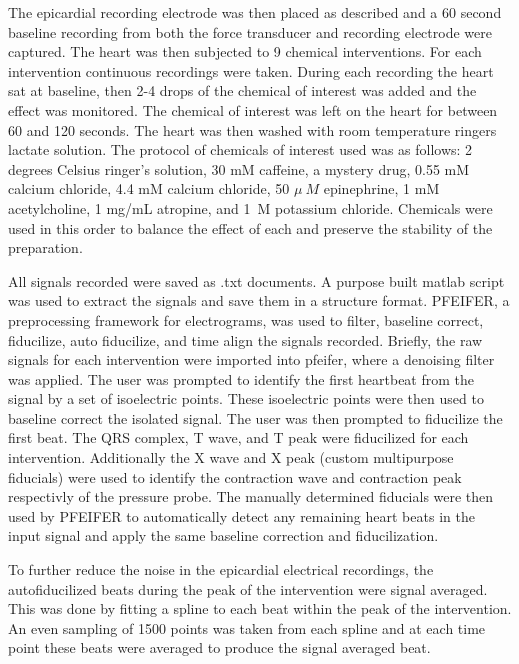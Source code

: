 \documentclass[12pt]{article}
\begin{document}
\par{}
The epicardial recording electrode was then placed as described and a 60 second baseline recording from both the force transducer and recording electrode were captured. The heart was then subjected to 9 chemical interventions. For each intervention continuous recordings were taken. During each recording the heart sat at baseline, then 2-4 drops of the chemical of interest was added and the effect was monitored. The chemical of interest was left on the heart for between 60 and 120 seconds. The heart was then washed with room temperature ringers lactate solution. The protocol of chemicals of interest used was as follows: 2 degrees Celsius ringer's solution, 30 mM caffeine, a mystery drug, 0.55 mM calcium chloride, 4.4 mM calcium chloride, 50 $\mu ~M$ epinephrine, 1 mM acetylcholine, 1 mg/mL atropine, and 1~M potassium chloride. Chemicals were used in this order to balance the effect of each and preserve the stability of the preparation.
\par{}
All signals recorded were saved as .txt documents. A purpose built matlab script was used to extract the signals and save them in a structure format. PFEIFER, a preprocessing framework for electrograms, was used to filter, baseline correct, fiducilize, auto fiducilize, and time align the signals recorded.\cite{MacLeod2018_p} Briefly, the raw signals for each intervention were imported into pfeifer, where a denoising filter was applied. The user was prompted to identify the first heartbeat from the signal by a set of isoelectric points. These isoelectric points were then used to baseline correct the isolated signal. The user was then prompted to fiducilize the first beat. The QRS complex, T wave, and T peak were fiducilized for each intervention. Additionally the X wave and X peak (custom multipurpose fiducials) were used to identify the contraction wave and contraction peak respectivly of the pressure probe. The manually determined fiducials were then used by PFEIFER to automatically detect any remaining heart beats in the input signal and apply the same baseline correction and fiducilization.

\par{}
To further reduce the noise in the epicardial electrical recordings, the autofiducilized beats during the peak of the intervention were signal averaged. This was done by fitting a spline to each beat within the peak of the intervention. An even sampling of 1500 points was taken from each spline and at each time point these beats were averaged to produce the signal averaged beat.
\end{document}
